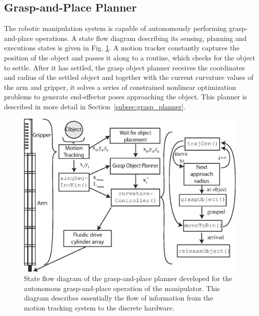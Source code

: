 \subsection{Grasp-and-Place Planner}
\label{subsec:grasp-place-planner}
The robotic manipulation system is capable of autonomously performing grasp-and-place operations. 
A state flow diagram describing its sensing, planning and executions states is given in Fig. \ref{fig:grasp-and-place-planner}. 
A motion tracker constantly captures the position of the object and passes it along to a routine, which checks for the object to settle. 
After it has settled, the grasp object planner receives the coordinates and radius of the settled object and together with the current curvature values of the arm and gripper, it solves a series of constrained nonlinear optimization problems to generate end-effector poses approaching the object.
This planner is described in more detail in Section~\ref{subsec:grasp_planner}.

\begin{figure}[!htb]
\centering
   \includegraphics[width=0.95\columnwidth]{Figures/processing_control/grasp_place_planner.eps}
   \caption{State flow diagram of the grasp-and-place planner developed for the autonomous grasp-and-place operation of the manipulator. This diagram describes essentially the flow of information from the motion tracking system to the discrete hardware.}
   \label{fig:grasp-and-place-planner}
\end{figure}

